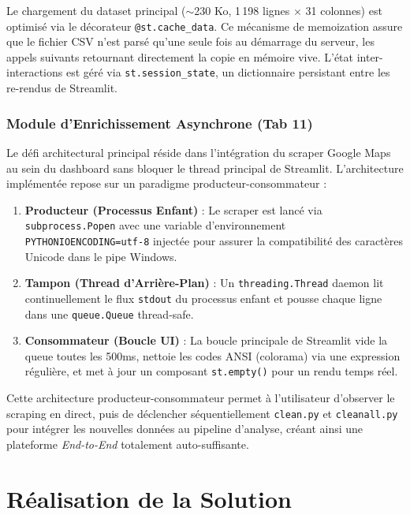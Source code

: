 \documentclass[11pt,a4paper,twoside]{report}
\begin{document}
Le chargement du dataset principal ($\sim$230 Ko, 1\,198 lignes $\times$ 31 colonnes) est optimisé via le décorateur \texttt{@st.cache\_data}. Ce mécanisme de memoization assure que le fichier CSV n'est parsé qu'une seule fois au démarrage du serveur, les appels suivants retournant directement la copie en mémoire vive. L'état inter-interactions est géré via \texttt{st.session\_state}, un dictionnaire persistant entre les re-rendus de Streamlit.

\subsection{Module d'Enrichissement Asynchrone (Tab 11)}

Le défi architectural principal réside dans l'intégration du scraper Google Maps au sein du dashboard sans bloquer le thread principal de Streamlit. L'architecture implémentée repose sur un paradigme producteur-consommateur :

\begin{enumerate}
    \item \textbf{Producteur (Processus Enfant)} : Le scraper est lancé via \texttt{subprocess.Popen} avec une variable d'environnement \texttt{PYTHONIOENCODING=utf-8} injectée pour assurer la compatibilité des caractères Unicode dans le pipe Windows.
    \item \textbf{Tampon (Thread d'Arrière-Plan)} : Un \texttt{threading.Thread} daemon lit continuellement le flux \texttt{stdout} du processus enfant et pousse chaque ligne dans une \texttt{queue.Queue} thread-safe.
    \item \textbf{Consommateur (Boucle UI)} : La boucle principale de Streamlit vide la queue toutes les 500ms, nettoie les codes ANSI (colorama) via une expression régulière, et met à jour un composant \texttt{st.empty()} pour un rendu temps réel.
\end{enumerate}

Cette architecture producteur-consommateur permet à l'utilisateur d'observer le scraping en direct, puis de déclencher séquentiellement \texttt{clean.py} et \texttt{cleanall.py} pour intégrer les nouvelles données au pipeline d'analyse, créant ainsi une plateforme \textit{End-to-End} totalement auto-suffisante.




\chapter{Réalisation de la Solution}
\end{document}
